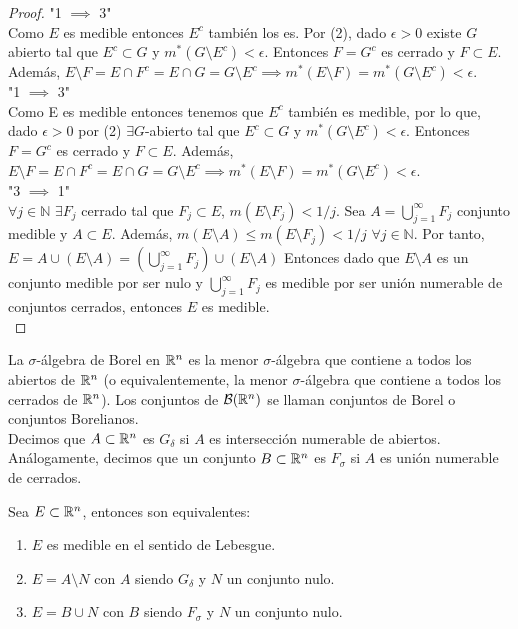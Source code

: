 \begin{proof}
    "1 $\implies$ 3"\\
    Como $E$ es medible entonces $E^c$ también los es. Por (2), dado $\epsilon > 0$ existe $G$ abierto tal que $E^c \subset G$ y $m^*(G \setminus E^c) < \epsilon$. Entonces $F = G^c$ es cerrado y $F \subset E$. Además, $E \setminus F = E \cap F^c = E \cap G = G \setminus E^c \implies m^*(E \setminus F) = m^*(G \setminus E^c) < \epsilon$.\\
    "1 $\implies$ 3"\\
    Como E es medible entonces tenemos que $E^c$ también es medible, por lo que, dado $\epsilon > 0$ por (2) $\exists G$-abierto tal que $E^c \subset G$ y $m^*(G \setminus E^c) < \epsilon$. Entonces $F = G^c$ es cerrado y $F \subset E$. Además, $E \setminus F = E \cap F^c = E \cap G = G \setminus E^c \implies m^*(E \setminus F) = m^*(G \setminus E^c) < \epsilon$.\\
    "3 $\implies$ 1"\\
    $\forall j \in \mathbb{N}$ $\exists F_j$ cerrado tal que $F_j \subset E$, $m(E \setminus F_j) < 1/j$. Sea $A = \bigcup_{j = 1}^{\infty} F_j$ conjunto medible y $A \subset E$. Además, $m(E \setminus A) \leq m(E \setminus F_j) < 1/j$ $\forall j \in \mathbb{N}$. Por tanto, $E = A \cup (E\setminus A) = (\bigcup_{j = 1}^{\infty}F_j) \cup (E\setminus A)$ Entonces dado que $E\setminus A$ es un conjunto medible por ser nulo y $\bigcup_{j = 1}^{\infty}F_j$ es medible por ser unión numerable de conjuntos cerrados, entonces $E$ es medible.\\

\end{proof}

\begin{definición} 
La $\sigma$-álgebra de Borel en $\mathbb{R}^n$ es la menor $\sigma$-álgebra que contiene a todos los abiertos de $\mathbb{R}^n$ (o equivalentemente, la menor $\sigma$-álgebra que contiene a todos los cerrados de $\mathbb{R}^n$). Los conjuntos de $\mathcal{B}(\mathbb{R}^n)$ se llaman conjuntos de Borel o conjuntos Borelianos.\\
Decimos que $A \subset \mathbb{R}^n$ es $G_\delta$ si $A$ es intersección numerable de abiertos. Análogamente, decimos que un conjunto $B \subset \mathbb{R}^n$ es $F_\sigma$ si $A$ es unión numerable de cerrados.
\end{definición}

\begin{corolario}
    Sea $E \subset \mathbb{R}^n$, entonces son equivalentes:
    \vspace{-0.5em}
    \begin{enumerate}
        \item $E$ es medible en el sentido de Lebesgue.
        \item $E = A \setminus N$ con $A$ siendo $G_\delta$ y $N$ un conjunto nulo.
        \item $E = B \cup N$ con $B$ siendo $F_\sigma$ y $N$ un conjunto nulo.
    \end{enumerate}
\end{corolario}

